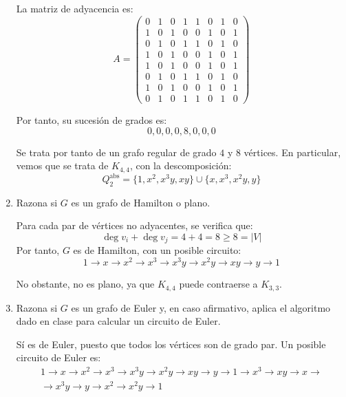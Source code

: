 \begin{ejercicio}
\begin{enumerate}
        La matriz de adyacencia es:
        \[
            A=\begin{pmatrix}
                0 & 1 & 0 & 1 & 1 & 0 & 1 & 0 \\
                1 & 0 & 1 & 0 & 0 & 1 & 0 & 1 \\
                0 & 1 & 0 & 1 & 1 & 0 & 1 & 0 \\
                1 & 0 & 1 & 0 & 0 & 1 & 0 & 1 \\
                1 & 0 & 1 & 0 & 0 & 1 & 0 & 1 \\
                0 & 1 & 0 & 1 & 1 & 0 & 1 & 0 \\
                1 & 0 & 1 & 0 & 0 & 1 & 0 & 1 \\
                0 & 1 & 0 & 1 & 1 & 0 & 1 & 0
            \end{pmatrix}
        \]

        Por tanto, su sucesión de grados es:
        \begin{equation*}
            0, 0, 0, 0, 8, 0, 0, 0
        \end{equation*}

        Se trata por tanto de un grafo regular de grado $4$ y $8$ vértices. En particular, vemos que se trata de $K_{4,4}$, con la descomposición:
        \begin{equation*}
            Q_2^{\text{abs}} = \{1, x^2, x^3y, xy\}\cup\{x, x^3, x^2y, y\}
        \end{equation*}

        
        \item Razona si $G$ es un grafo de Hamilton o plano.
        
        Para cada par de vértices no adyacentes, se verifica que:
        \begin{equation*}
            \deg v_i + \deg v_j = 4 + 4 = 8 \geq 8=|V|
        \end{equation*}
        Por tanto, $G$ es de Hamilton, con un posible circuito:
        \begin{equation*}
            1\to x\to x^2\to x^3\to x^3y\to x^2y\to xy\to y\to 1
        \end{equation*}

        No obstante, no es plano, ya que $K_{4,4}$ puede contraerse a $K_{3,3}$.
        \item Razona si $G$ es un grafo de Euler y, en caso afirmativo, aplica el algoritmo dado en clase para calcular un circuito de Euler.
        
        Sí es de Euler, puesto que todos los vértices son de grado par. Un posible circuito de Euler es:
        \begin{multline*}
            1\to x\to x^2\to x^3\to x^3y\to x^2y\to xy\to y\to 1\to x^3\to xy\to x\to \\ \to x^3y\to y\to x^2\to x^2y\to 1
        \end{multline*}
    \end{enumerate}
\end{ejercicio}

